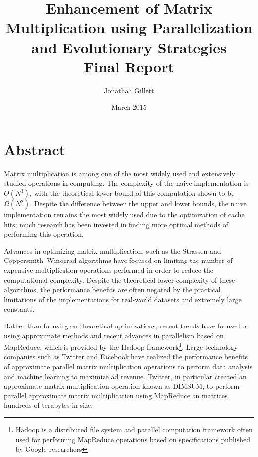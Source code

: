 \documentclass[oneside]{article}
\title{Enhancement of Matrix Multiplication using Parallelization and Evolutionary Strategies \\ \vspace{2 mm} {\Large Final Report}}
\author{Jonathan Gillett}
\date{March 2015}
\begin{document}
\maketitle



\section{Abstract}

\doublespacing
Matrix multiplication is among one of the most widely used and extensively studied operations in computing\cite{raz2002complexity}. The complexity of the naive implementation is $O(N^{3})$\cite{raz2002complexity}, with the theoretical lower bound of this computation shown to be $\Omega(N^{2})$\cite{raz2002complexity}. Despite the difference between the upper and lower bounds, the naive implementation remains the most widely used due to the optimization of cache hits\cite{note2002reducing}; much research has been invested in finding more optimal methods of performing this operation.

Advances in optimizing matrix multiplication, such as the Strassen and Coppersmith–Winograd algorithms\cite{huss1996implementation, coppersmith1987matrix} have focused on limiting the number of expensive multiplication operations performed in order to reduce the computational complexity. Despite the theoretical lower complexity of these algorithms, the performance benefits are often negated by the practical limitations of the implementations for real-world datasets and extremely large constants\cite{robinson2005toward}.

Rather than focusing on theoretical optimizations, recent trends have focused on using approximate methods and recent advances in parallelism based on MapReduce, which is provided by the Hadoop framework\footnote{Hadoop is a distributed file system and parallel computation framework\cite{shvachko2010hadoop} often used for performing MapReduce operations based on specifications published by Google researchers\cite{dean2008mapreduce}}. Large technology companies such as Twitter and Facebook have realized the performance benefits of approximate parallel matrix multiplication operations to perform data analysis and machine learning to maximize ad revenue. Twitter, in particular created an approximate matrix multiplication operation known as DIMSUM, to perform parallel approximate matrix multiplication using MapReduce on matrices hundreds of terabytes in size\cite{zadeh2013dimension}.
\end{document}
